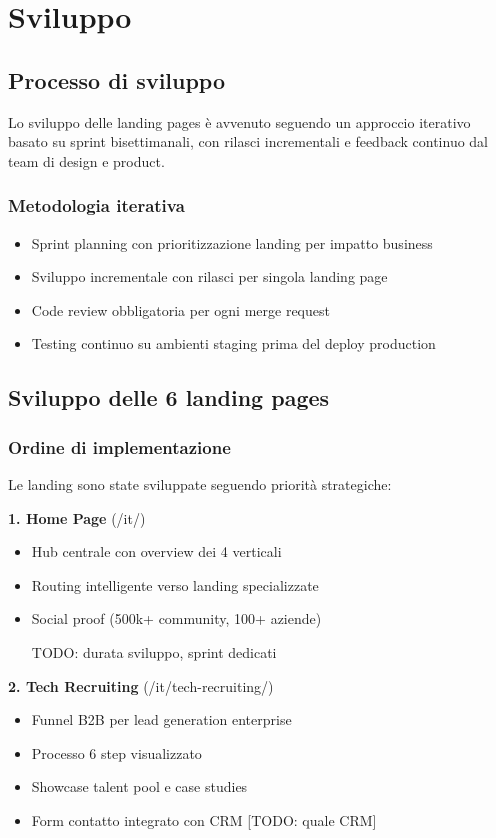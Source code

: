 \chapter{Sviluppo}

\section{Processo di sviluppo}
Lo sviluppo delle landing pages è avvenuto seguendo un approccio iterativo basato su sprint bisettimanali, con rilasci incrementali e feedback continuo dal team di design e product.

\subsection{Metodologia iterativa}
\begin{itemize}
  \item Sprint planning con prioritizzazione landing per impatto business
  \item Sviluppo incrementale con rilasci per singola landing page
  \item Code review obbligatoria per ogni merge request
  \item Testing continuo su ambienti staging prima del deploy production
\end{itemize}

\section{Sviluppo delle 6 landing pages}
\subsection{Ordine di implementazione}
Le landing sono state sviluppate seguendo priorità strategiche:

\textbf{1. Home Page} (/it/)
\begin{itemize}
  \item Hub centrale con overview dei 4 verticali
  \item Routing intelligente verso landing specializzate
  \item Social proof (500k+ community, 100+ aziende)
  \item [TODO: durata sviluppo, sprint dedicati]
\end{itemize}

\textbf{2. Tech Recruiting} (/it/tech-recruiting/)
\begin{itemize}
  \item Funnel B2B per lead generation enterprise
  \item Processo 6 step visualizzato
  \item Showcase talent pool e case studies
  \item Form contatto integrato con CRM [TODO: quale CRM]
\end{itemize}

